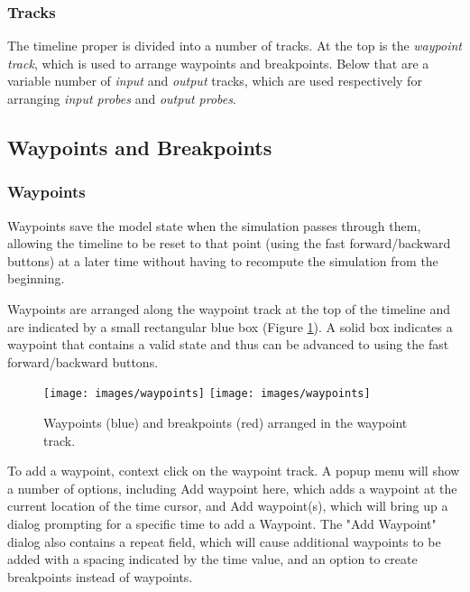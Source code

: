 \documentclass{article}
\begin{document}

\subsubsection{Tracks}

The timeline proper is divided into a number of tracks. At the top is
the {\it waypoint track}, which is used to arrange waypoints and 
breakpoints. Below that are a variable number of {\it input} and
{\it output} tracks, which are used respectively for arranging {\it input
probes} and {\it output probes}.


\subsection{Waypoints and Breakpoints}
\label{waypointsSec}

\subsubsection{Waypoints}

Waypoints save the model state when the simulation passes through
them, allowing the timeline to be reset to that point (using the
fast forward/backward buttons) at a later time without having to
recompute the simulation from the beginning.

Waypoints are arranged along the waypoint track at the top of the
timeline and are indicated by a small rectangular blue box
(Figure \ref{waypointsFig}). A solid box indicates a waypoint that contains a
valid state and thus can be advanced to using the fast forward/backward
buttons.

\begin{figure}
\begin{center}
\iflatexml
\texttt{[image: images/waypoints]}
\else
\texttt{[image: images/waypoints]}
\fi
\end{center}
\caption{Waypoints (blue) and breakpoints (red) arranged in the waypoint track.}%
\label{waypointsFig}
\end{figure}

To add a waypoint, context click on the waypoint track.  A popup menu will
show a number of options, including {\sf Add waypoint here}, which adds a
waypoint at the current location of the time cursor, and {\sf Add
waypoint(s)}, which will bring up a dialog prompting for a specific time
to add a Waypoint. The "Add Waypoint" dialog also contains a {\sf repeat}
field, which will cause additional waypoints to be added with a spacing
indicated by the time value, and an option to create breakpoints instead
of waypoints.
\end{document}
